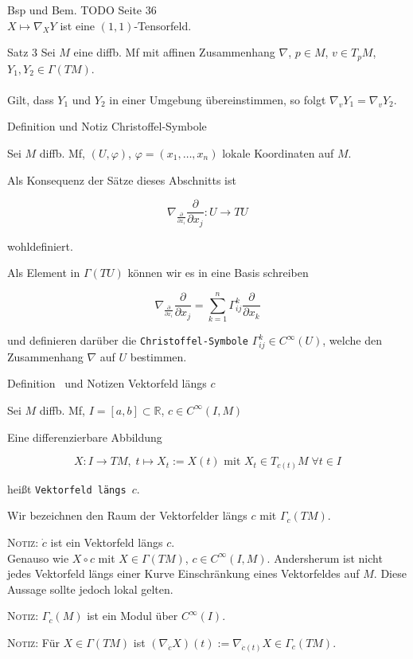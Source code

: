 \documentclass[a6paper,11pt,grid=front]{kartei}
\newcommand{\fl}[1]{\begin{flushleft}
 #1 \end{flushleft}}
\newcommand{\R}{\mathbb{R}}
\newcommand{\pd}[1][x_i]{\frac{\partial}{\partial {#1}}}
\newcounter{def}
\newcounter{satz}
\newcommand{\defreset}{\setcounter{def}{1}}
\newcommand{\satzreset}{\setcounter{satz}{1}}
\newcommand{\thisdef}{\thedef\ \stepcounter{def}}
\begin{document}
\nonameyet
{Bsp und Bem.} {}
{
TODO Seite 36
\\
$X\mapsto \nabla_X Y$ ist eine $(1,1)$-Tensorfeld.
}
{}

\nonameyet
{Satz 3} {}
{
Sei $M$ eine diffb. Mf mit affinen Zusammenhang $\nabla$, $p\in M$, $v\in T_pM$,
$Y_1,Y_2 \in \Gamma(TM)$.
\\
~\\
Gilt, dass  $Y_1$ und $Y_2$ in einer Umgebung übereinstimmen, so folgt 
$\nabla_v Y_1 = \nabla_v Y_2$.
}
{}

\nonameyet
{Definition und Notiz} {Christoffel-Symbole}
{
\small
Sei $M$ diffb. Mf, $(U,\varphi)$, $\varphi = (x_1,\dots,x_n)$ lokale
Koordinaten auf $M$.

\fl{Als Konsequenz der Sätze dieses Abschnitts ist}
\[
\nabla_{\pd} \pd[x_j] : U \to TU
\]
\fl{wohldefiniert.}
%
\fl{Als Element in $\Gamma(TU)$ können wir es in eine Basis schreiben }
\[
\nabla_{\pd} \pd[x_j] = \sum_{k=1}^n \Gamma^k_{ij} \pd[x_k]
\]
\fl{und definieren darüber die \texttt{Christoffel-Symbole} 
$\Gamma^k_{ij} \in C^\infty(U)$, welche den Zusammenhang $\nabla$ auf 
$U$ bestimmen.}
}
{}
\defreset
\satzreset

\nonameyet
{\small Definition \thisdef und Notizen} {\small Vektorfeld längs $c$}
{
\small
Sei $M$ diffb. Mf, $I = [a,b] \subset \R$, $c\in C^\infty(I,M)$
\fl{Eine differenzierbare Abbildung  }
\[
X: I \to TM,\; t \mapsto X_t := X(t) \text{ mit } X_t \in T_{c(t)}M \; \forall t\in I
\]
\fl{heißt \texttt{Vektorfeld längs $c$}.}
\fl{Wir bezeichnen den Raum der Vektorfelder längs $c$ mit $\Gamma_c(TM)$.}

\fl{\textsc{Notiz:} $\dot c$ ist ein Vektorfeld längs $c$. \\
Genauso wie $X\circ c$ mit $X\in\Gamma(TM)$, $c\in C^\infty(I,M)$.
Andersherum ist nicht jedes Vektorfeld längs einer Kurve Einschränkung
eines Vektorfeldes auf $M$. Diese Aussage sollte jedoch lokal gelten.
}
\fl{\textsc{Notiz:} $\Gamma_c(M)$ ist ein Modul über $C^\infty(I)$.}
\fl{\textsc{Notiz:} Für $X \in \Gamma(TM)$ ist 
$(\nabla_{\dot c} X)(t) := \nabla_{\dot c(t)} X \in \Gamma_c(TM)$.}
}
{}
\end{document}
